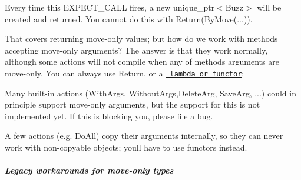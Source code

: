 Every time this {\ttfamily E\+X\+P\+E\+C\+T\+\_\+\+C\+A\+LL} fires, a new {\ttfamily unique\+\_\+ptr$<$Buzz$>$} will be created and returned. You cannot do this with {\ttfamily Return(\+By\+Move(...))}.

That covers returning move-\/only values; but how do we work with methods accepting move-\/only arguments? The answer is that they work normally, although some actions will not compile when any of method\textquotesingle{}s arguments are move-\/only. You can always use {\ttfamily Return}, or a \href{\#FunctionsAsActions}{\texttt{ lambda or functor}}\+:


\begin{DoxyCode}{0}
\DoxyCodeLine{}
\DoxyCodeLine{}
\end{DoxyCode}


Many built-\/in actions ({\ttfamily With\+Args}, {\ttfamily Without\+Args},{\ttfamily Delete\+Arg}, {\ttfamily Save\+Arg}, ...) could in principle support move-\/only arguments, but the support for this is not implemented yet. If this is blocking you, please file a bug.

A few actions (e.\+g. {\ttfamily Do\+All}) copy their arguments internally, so they can never work with non-\/copyable objects; you\textquotesingle{}ll have to use functors instead.

\label{md_cmake-build-debug_googletest-src_googlemock_docs_CookBook_LegacyMoveOnly}%
%
\subparagraph*{Legacy workarounds for move-\/only types}


